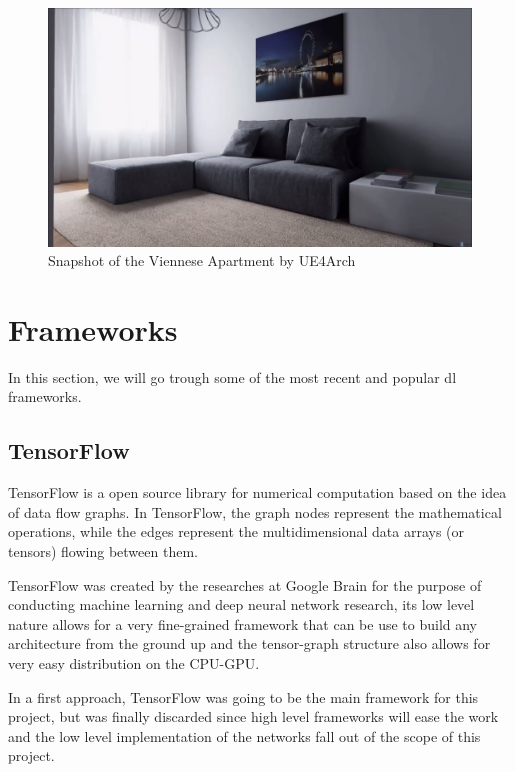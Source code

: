 \begin{figure}[h]
	\includegraphics[scale=0.2]{archivos/london_apartment.png}
	\centering
	\caption[Snapshot of the Viennese Apartbent by UE4Arch]{Snapshot of the Viennese Apartment by UE4Arch\footnotemark}
	\label{fig:london_apartment}
\end{figure}

\section{Frameworks}

In this section, we will go trough some of the most recent and popular \gls{dl} frameworks.

\subsection{TensorFlow}
TensorFlow is a open source library for numerical computation based on the idea of data flow graphs. In TensorFlow, the graph nodes represent the mathematical operations, while the edges represent the multidimensional data arrays (or tensors) flowing between them.

TensorFlow was created by the researches at Google Brain for the purpose of conducting machine learning and deep neural network research, its low level nature allows for a very fine-grained framework that can be use to build any architecture from the ground up and the tensor-graph structure also allows for very easy distribution on the CPU-GPU.


In a first approach, TensorFlow was going to be the main framework for this project, but was finally discarded since high level frameworks will ease the work and the low level implementation of the networks fall out of the scope of this project.


